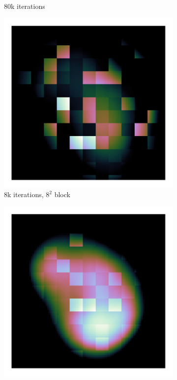 \begin{figure}[h]
\begin{subfigure}[b]{0.245\linewidth}
		\caption{80k iterations}
		\label{pcdm:adaption:randomProblem:block12}
	\end{subfigure}
		\begin{subfigure}[b]{0.245\linewidth}
		\includegraphics[width=1.00\linewidth, clip, trim= 0.25in 0.25in 0.25in 0.25in]{./chapters/05.pcdm/randomProblem/random_1k_block8.png}
		\caption{8k iterations, $8^2$ block}
		\label{pcdm:adaption:randomProblem:block81}
	\end{subfigure}
		\begin{subfigure}[b]{0.2405\linewidth}
		\includegraphics[width=1.00\linewidth, clip, trim= 0.25in 0.25in 0.25in 0.25in]{./chapters/05.pcdm/randomProblem/random_10k_block8.png}

\end{subfigure}
\end{figure}
